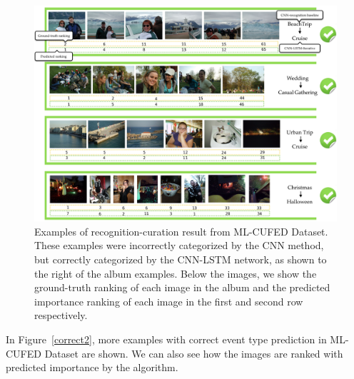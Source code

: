 \documentclass[runningheads]{llncs}
\begin{document}
\begin{figure}
\vspace{-0.1in}
\centering
\includegraphics[width=5in]{correct1}
\caption{Examples of recognition-curation result from ML-CUFED Dataset.  These examples were incorrectly categorized by the CNN method, but correctly categorized by the CNN-LSTM network, as shown to the right of the album examples. Below the images, we show the ground-truth ranking of each image in the album and the predicted importance ranking of each image in the first and second row respectively.}
\label{correct1}
\vspace{-0.2in}
\end{figure}

In Figure~\ref{correct2}, more examples with correct event type prediction in ML-CUFED Dataset are shown. We can also see how the images are ranked with predicted importance by the algorithm.
\end{document}
